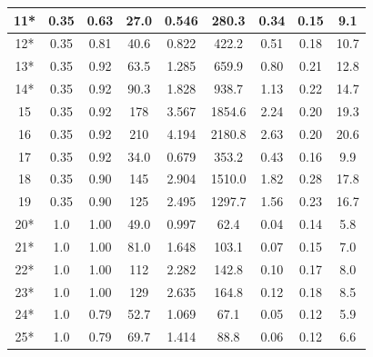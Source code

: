 \begin{table}[!ht]
\begin{center}
\begin{tabular}{|c|c|c|c|c|c|c||c|c|}
11*       & 0.35     & 0.63       & 27.0        &  0.546                &  280.3         & 0.34          & 0.15       & 9.1      \\ \hline
12*       & 0.35     & 0.81       & 40.6        &  0.822                &  422.2         & 0.51          & 0.18       & 10.7      \\ \hline
13*       & 0.35     & 0.92       & 63.5        &  1.285                &  659.9         & 0.80          & 0.21       & 12.8       \\ \hline
14*       & 0.35     & 0.92       & 90.3        &  1.828                &  938.7         & 1.13          & 0.22       & 14.7       \\ \hline
15        & 0.35     & 0.92       & 178         &  3.567                &  1854.6        & 2.24          & 0.20       & 19.3       \\ \hline
16        & 0.35     & 0.92       & 210         &  4.194                &  2180.8        & 2.63          & 0.20       & 20.6       \\ \hline
17        & 0.35     & 0.92       & 34.0        &  0.679                &  353.2         & 0.43          & 0.16       & 9.9      \\ \hline
18        & 0.35     & 0.90       & 145         &  2.904                &  1510.0        & 1.82          & 0.28       & 17.8       \\ \hline
19        & 0.35     & 0.90       & 125         &  2.495                &  1297.7        & 1.56          & 0.23       & 16.7       \\ \hline
20*       & 1.0      & 1.00       & 49.0        &  0.997                &  62.4          & 0.04          & 0.14       & 5.8      \\ \hline
21*       & 1.0      & 1.00       & 81.0        &  1.648                &  103.1         & 0.07          & 0.15       & 7.0      \\ \hline
22*       & 1.0      & 1.00       & 112         &  2.282                &  142.8         & 0.10          & 0.17       & 8.0       \\ \hline
23*       & 1.0      & 1.00       & 129         &  2.635                &  164.8         & 0.12          & 0.18       & 8.5       \\ \hline
24*       & 1.0      & 0.79       & 52.7        &  1.069                &  67.1          & 0.05          & 0.12       & 5.9      \\ \hline
25*       & 1.0      & 0.79       & 69.7        &  1.414                &  88.8          & 0.06          & 0.12       & 6.6      \\ \hline

\end{tabular}
\end{center}
\end{table}
